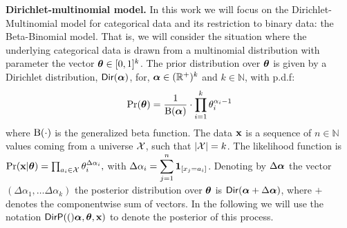 \documentclass{article}
\begin{document}
\noindent \textbf{Dirichlet-multinomial model.}
In this work we will focus on the Dirichlet-Multinomial model for
categorical data and its restriction to binary data: the Beta-Binomial
model. 
That is, we will consider the situation where 
the underlying categorical data is drawn from a multinomial
distribution with parameter the vector $\boldsymbol{\theta}\in [0,1]^{k}$. The prior distribution over $\boldsymbol{\theta}$
is given by a Dirichlet distribution, $\mathsf{Dir}(\boldsymbol{\alpha})$, for,
$\boldsymbol{\alpha}\in(\mathbb{R}^{+})^{k}$ and $k\in\mathbb{N}$, with p.d.f:
\[
\Pr(\boldsymbol{\theta})=\frac{1}{\boldsymbol{\textup{B}}(\boldsymbol{\alpha})}\cdot\prod_{i=1}^{k}{\theta_i^{\alpha_i-1}}
\]
where $\boldsymbol{\textup{B}}(\cdot)$ is the generalized beta function.
The data $\textbf{x}$ is a sequence of $n\in\mathbb{N}$ values
coming from a universe $\mathcal{X}$, such that $|\mathcal{X}|=k$.
The likelihood function is
$
\Pr(\textbf{x}|\boldsymbol{\theta})=\prod_{a_i\in\mathcal{X}}\theta_{i}^{\Delta \alpha_i},
$
with $\Delta \alpha_i=\displaystyle\sum_{j=1}^{n}\mathbf{1}_{[x_j=a_i]}$.
Denoting by $\Delta\boldsymbol{\alpha}$ the vector $(\Delta\alpha_1,\dots
\Delta\alpha_k)$ the posterior distribution over $\boldsymbol{\theta}$ is
$\mathsf{Dir}(\boldsymbol{\alpha} + \Delta \boldsymbol{\alpha})$, where $+$ denotes the componentwise sum of vectors.
In the following we will use the notation $\mathsf{DirP}(()\boldsymbol{\alpha},\boldsymbol{\theta},
\textbf{x})$ to denote the posterior of this process.
%
\end{document}
